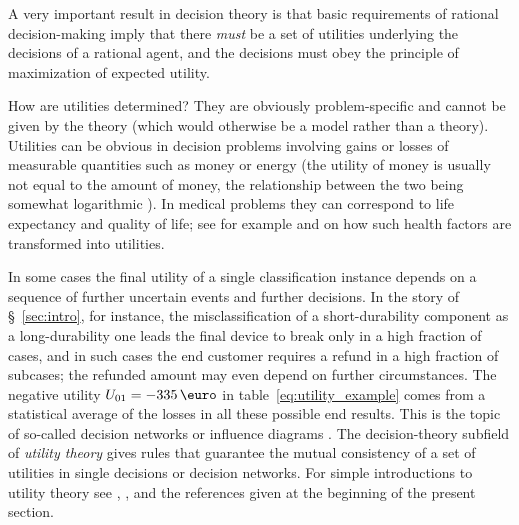 \documentclass[\ifafour a4paper,12pt,\else a5paper,10pt,\fi%
onecolumn,oneside,article,%
british%
]{memoir}
\theoremstyle{remark}
\theoremstyle{innote}
\newcommand*{\p}{\mathrm{p}}%
\renewcommand*{\|}[1][]{\nonscript\:#1\vert\nonscript\:\mathopen{}}
\newcommand*{\sect}{\S}%
\newcommand*{\chap}{ch.}%
\newcommand*{\chaps}{chs}%
\newcommand*{\eg}{{e.g.}}
\newcommand*{\eu}{\bar{U}}
\begin{document}

A very important result in decision theory is that basic requirements of rational decision-making imply that there \emph{must} be a set of utilities underlying the decisions of a rational agent, and the decisions must obey the principle of maximization of expected utility\autocites[\sect~15.2]{russelletal1995_r2022}[\chaps~2--3]{neumannetal1944_r1955}.

How are utilities determined? They are obviously problem-specific and cannot be given by the theory (which would otherwise be a model rather than a theory). Utilities can be obvious in decision problems involving gains or losses of measurable quantities such as money or energy (the utility of money is usually not equal to the amount of money, the relationship between the two being somewhat logarithmic \autocites[\eg][pp.~203--204]{north1968}[\chap~4]{raiffa1968_r1970}). In medical problems they can correspond to life expectancy and quality of life; see for example \cite[esp. \chap~8 and \sect~11.2.9]{soxetal1988_r2013} and \cite[esp. \chap~4]{huninketal2001_r2014} on how such health factors are transformed into utilities.

In some cases the final utility of a single classification instance depends on a sequence of further uncertain events and further decisions. In the story of \sect~\ref{sec:intro}, for instance, the misclassification of a short-durability component as a long-durability one leads the final device to break only in a high fraction of cases, and in such cases the end customer requires a refund in a high fraction of subcases; the refunded amount may even depend on further circumstances. The negative utility $U_{01} = -335\,\text{\texteuro}$ in table~\eqref{eq:utility_example} comes from a statistical average of the losses in all these possible end results. This is the topic of so-called decision networks or influence diagrams \autocites[Besides the general references already given:][\sect~15.5]{russelletal1995_r2022}{howardetal1984b_r2005}. The decision-theory subfield of \emph{utility theory} gives rules that guarantee the mutual consistency of a set of utilities in single decisions or decision networks. For simple introductions to utility theory see \cite[\sect~15.2]{russelletal1995_r2022}, \cite[pp.~201--205]{north1968}, and the references given at the beginning of the present section.
\end{document}
